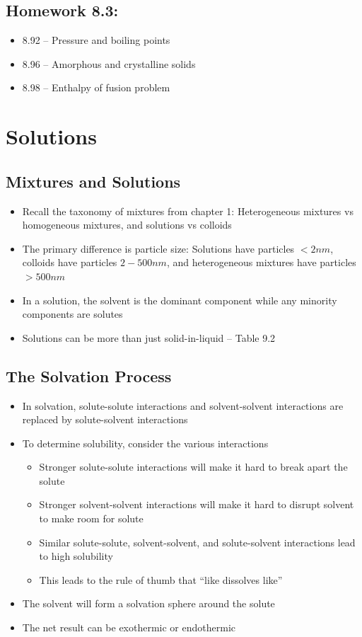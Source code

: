\documentclass[12pt, openany, letterpaper]{memoir}
\begin{document}
\section*{Homework 8.3:}
\begin{itemize}
	\item 8.92 -- Pressure and boiling points
	\item 8.96 -- Amorphous and crystalline solids
	\item 8.98 -- Enthalpy of fusion problem
\end{itemize}

\chapter{Solutions}
\section{Mixtures and Solutions}
\begin{itemize}
	\item Recall the taxonomy of mixtures from chapter 1: Heterogeneous mixtures vs homogeneous mixtures, and solutions vs colloids
	\item The primary difference is particle size: Solutions have particles $<2nm$, colloids have particles $2-500nm$, and heterogeneous mixtures have particles $>500nm$
	\item In a solution, the solvent is the dominant component while any minority components are solutes
	\item Solutions can be more than just solid-in-liquid -- Table 9.2
\end{itemize}

\section{The Solvation Process}
\begin{itemize}
	\item In solvation, solute-solute interactions and solvent-solvent interactions are replaced by solute-solvent interactions
	\item To determine solubility, consider the various interactions
	      \begin{itemize}
		      \item Stronger solute-solute interactions will make it hard to break apart the solute
		      \item Stronger solvent-solvent interactions will make it hard to disrupt solvent to make room for solute
		      \item Similar solute-solute, solvent-solvent, and solute-solvent interactions lead to high solubility
		      \item This leads to the rule of thumb that ``like dissolves like''
	      \end{itemize}
	\item The solvent will form a solvation sphere around the solute
	\item The net result can be exothermic or endothermic
\end{itemize}
\end{document}
